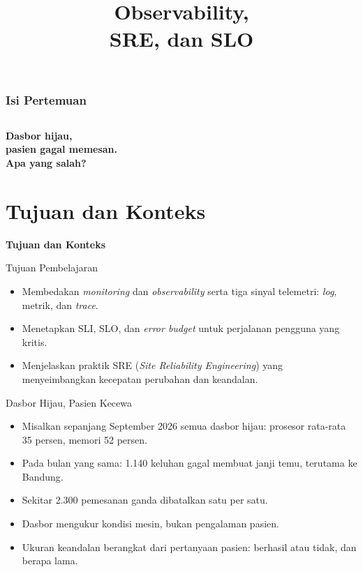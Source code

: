 \documentclass[aspectratio=169, table, 12pt]{beamer}
\title{\Huge Observability,\\ \vspace{10pt} SRE, dan SLO}
\begin{document}
\frame{\titlepage}

\begin{frame}
  \frametitle{Isi Pertemuan}
  \vspace{14pt}
  \begin{columns}[t]
    {\small\tableofcontents[sections={1-4}]}

    {\small\tableofcontents[sections={5-8}]}
  \end{columns}
\end{frame}

\begin{frame}{\hfill}
  \centering
  \Huge{\textbf{Dasbor hijau,\\pasien gagal memesan.\\Apa yang salah?}}
\end{frame}

\section{Tujuan dan Konteks}

\begin{frame}{\hfill}
  \centering
  \Huge{\textbf{Tujuan dan Konteks}}
\end{frame}

\begin{frame}{{\Large Tujuan Pembelajaran}}
  \vspace{10pt}
  \begin{itemize}
    \item Membedakan \textit{monitoring} dan \textit{observability} serta tiga sinyal
          telemetri: \textit{log}, metrik, dan \textit{trace}.
    \item Menetapkan SLI, SLO, dan \textit{error budget} untuk perjalanan pengguna yang
          kritis.
    \item Menjelaskan praktik SRE (\textit{Site Reliability Engineering}) yang
          menyeimbangkan kecepatan perubahan dan keandalan.
  \end{itemize}
\end{frame}

\begin{frame}{{\Large Dasbor Hijau, Pasien Kecewa}}
  \vspace{10pt}
  \begin{itemize}
    \item Misalkan sepanjang September 2026 semua dasbor hijau: prosesor rata-rata 35
          persen, memori 52 persen.
    \item Pada bulan yang sama: 1.140 keluhan gagal membuat janji temu, terutama ke
          Bandung.
    \item Sekitar 2.300 pemesanan ganda dibatalkan satu per satu.
    \item Dasbor mengukur kondisi mesin, bukan pengalaman pasien.
    \item Ukuran keandalan berangkat dari pertanyaan pasien: berhasil atau tidak, dan
          berapa lama.
  \end{itemize}
\end{frame}
\end{document}
